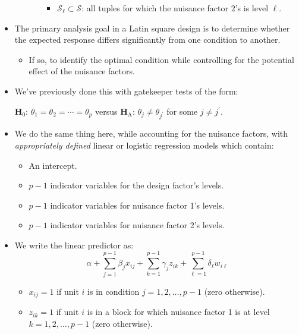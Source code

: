 \begin{itemize}
\begin{itemize}
\begin{itemize}
\begin{itemize}
                                  \item $ \mathcal{S}_\ell\subset \mathcal{S} $: all tuples for which the nuisance factor $ 2 $'s is level $ \ell $.
                              \end{itemize}
                    \end{itemize}
          \end{itemize}
    \item The primary analysis goal in a Latin square design is to determine whether the expected response differs significantly
          from one condition to another.
          \begin{itemize}
              \item If so, to identify the optimal condition while controlling for the potential effect of the nuisance factors.
          \end{itemize}
    \item We've previously done this with gatekeeper tests of the form:
          \begin{tightcenter}
              $ \mathbf{H}_0 $: $ \theta_1=\theta_2=\cdots=\theta_p $ versus $ \mathbf{H}_\text{A} $: $ \theta_j\ne \theta_{j^\prime} $ for some $ j\ne j^\prime $.
          \end{tightcenter}
    \item We do the same thing here, while accounting for the nuisance factors, with \emph{appropriately defined} linear
          or logistic regression models which contain:
          \begin{itemize}
              \item An intercept.
              \item $ p-1 $ indicator variables for the design factor's levels.
              \item $ p-1 $ indicator variables for nuisance factor 1's levels.
              \item $ p-1 $ indicator variables for nuisance factor 2's levels.
          \end{itemize}
    \item We write the linear predictor as:
          \[ \alpha+\sum_{j=1}^{p-1} \beta_j x_{ij}+\sum_{k=1}^{p-1} \gamma_j z_{ik}+\sum_{\ell=1}^{p-1} \delta_\ell w_{i\ell} \]
          \begin{itemize}
              \item $ x_{ij}=1 $ if unit $ i $ is in condition $ j=1,2,\ldots,p-1 $ (zero otherwise).
              \item $ z_{ik}=1 $ if unit $ i $ is in a block for which nuisance factor 1 is at level $ k=1,2,\ldots,p-1 $ (zero otherwise).

\end{itemize}
\end{itemize}
